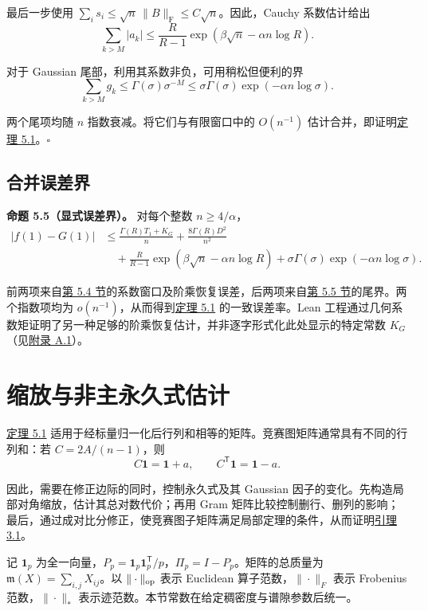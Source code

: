 \documentclass[11pt,a4paper]{article}
\makeatletter
\newcommand{\paperstatement}[3]{\par\addvspace{6pt}\Needspace{4\baselineskip}\phantomsection\def\@currentlabel{#2}\label{#3}\noindent\textbf{#1}\enspace}
\newcommand{\paperref}[2]{\hyperref[#1]{#2}}
\makeatother
\begin{document}
最后一步使用 \(\sum_i s_i\le\sqrt n\,\|B\|_{\mathrm F}\le C\sqrt n\)。因此，Cauchy 系数估计给出
\[\sum_{k>M}|a_k|
\le\frac{R}{R-1}
\exp\!\left(\beta\sqrt n-\alpha n\log R\right).\]

对于 Gaussian 尾部，利用其系数非负，可用稍松但便利的界
\[\sum_{k>M}g_k
\le \Gamma(\sigma)\sigma^{-M}
\le\sigma\Gamma(\sigma)\exp\!\left(-\alpha n\log\sigma\right).\]

两个尾项均随 \(n\) 指数衰减。将它们与有限窗口中的 \(O(n^{-1})\) 估计合并，即证明\paperref{thm-5.1}{定理 5.1}。\nobreak\hspace{.5em}\mbox{$\square$}

\subsection{合并误差界}\label{sec-5.6}

\paperstatement{命题 5.5（显式误差界）。}{5.5}{thm-5.5} 对每个整数 \(n\ge4/\alpha\)，
\[\begin{aligned}
|f(1)-G(1)|
&\le \frac{\Gamma(R)T_1+K_G}{n}
+\frac{8\Gamma(R)D^2}{n^2}
\\&\quad+\frac{R}{R-1}\exp\!\left(\beta\sqrt n-\alpha n\log R\right)
+\sigma\Gamma(\sigma)\exp\!\left(-\alpha n\log\sigma\right).
\end{aligned}\]

前两项来自\paperref{sec-5.4}{第 5.4 节}的系数窗口及阶乘恢复误差，后两项来自\paperref{sec-5.5}{第 5.5 节}的尾界。两个指数项均为 \(o(n^{-1})\)，从而得到\paperref{thm-5.1}{定理 5.1} 的一致误差率。Lean 工程通过几何系数矩证明了另一种足够的阶乘恢复估计，并非逐字形式化此处显示的特定常数 \(K_G\)（见\paperref{sec-A.1}{附录 A.1}）。

\section{缩放与非主永久式估计}\label{sec-6}

\paperref{thm-5.1}{定理 5.1} 适用于经标量归一化后行列和相等的矩阵。竞赛图矩阵通常具有不同的行列和：若 \(C=2A/(n-1)\)，则
\[C\mathbf1=\mathbf1+a,\qquad C^{\mathsf T}\mathbf1=\mathbf1-a.\]

因此，需要在修正边际的同时，控制永久式及其 Gaussian 因子的变化。先构造局部对角缩放，估计其总对数代价；再用 Gram 矩阵比较控制删行、删列的影响；最后，通过成对比分修正，使竞赛图子矩阵满足局部定理的条件，从而证明\paperref{thm-3.1}{引理 3.1}。

记 \(\mathbf1_p\) 为全一向量，\(P_p=\mathbf1_p\mathbf1_p^{\mathsf T}/p\)，\(\Pi_p=I-P_p\)。矩阵的总质量为 \(\mathfrak m(X)=\sum_{i,j}X_{ij}\)。以 \(\|\cdot\|_{\rm op}\) 表示 Euclidean 算子范数，\(\|\cdot\|_F\) 表示 Frobenius 范数，\(\|\cdot\|_*\) 表示迹范数。本节常数在给定稠密度与谱隙参数后统一。
\end{document}
